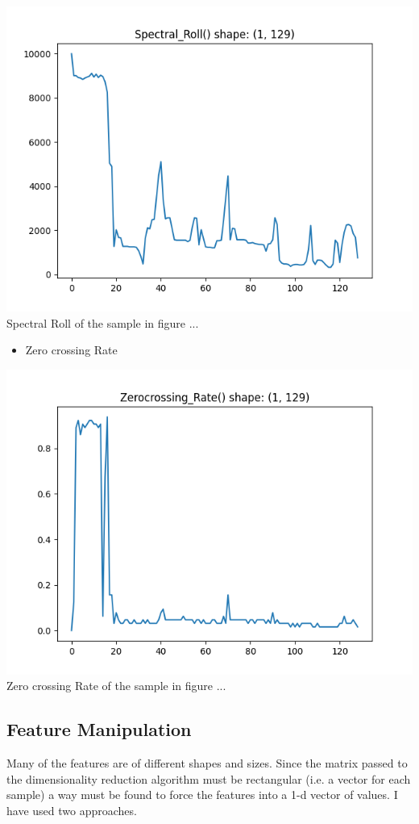 \documentclass[11pt]{article}
\begin{document}
\begin{center}
\includegraphics[width=.9\linewidth]{./Figures/Spectral_Roll.png}
Spectral Roll of the sample in figure ...
\end{center}
\begin{itemize}
\item Zero crossing Rate
\end{itemize}
\begin{center}
\includegraphics[width=.9\linewidth]{./Figures/ZeroCrossing_Rate.png}
Zero crossing Rate of the sample in figure ...
\end{center}
\subsection{Feature Manipulation}
\label{sec:org8cae6ed}

Many of the features are of different shapes and sizes. Since the matrix passed to the dimensionality reduction algorithm must be rectangular (i.e. a vector for each sample) a way must be found to force the features into a 1-d vector of values. I have used two approaches.
\end{document}
